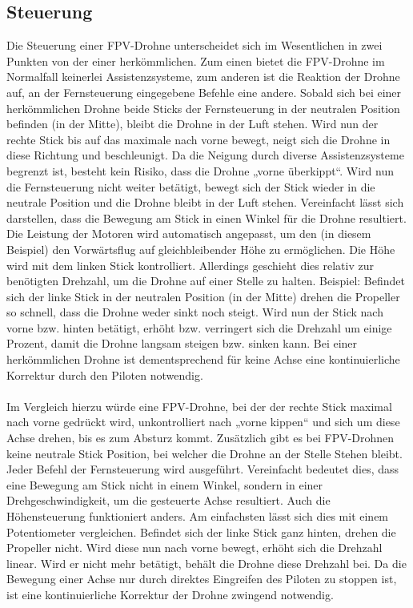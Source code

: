 \subsection[Steuerung]{Steuerung}
Die Steuerung einer FPV-Drohne unterscheidet sich im Wesentlichen in zwei Punkten von der einer herkömmlichen. Zum einen bietet die FPV-Drohne im Normalfall keinerlei Assistenzsysteme, zum anderen ist die Reaktion der Drohne auf, an der Fernsteuerung eingegebene Befehle eine andere. Sobald sich bei einer herkömmlichen Drohne beide Sticks der Fernsteuerung in der neutralen Position befinden (in der Mitte), bleibt die Drohne in der Luft stehen. Wird nun der rechte Stick bis auf das maximale nach vorne bewegt, neigt sich die Drohne in diese Richtung und beschleunigt. Da die Neigung durch diverse Assistenzsysteme begrenzt ist, besteht kein Risiko, dass die Drohne „vorne überkippt“. Wird nun die Fernsteuerung nicht weiter betätigt, bewegt sich der Stick wieder in die neutrale Position und die Drohne bleibt in der Luft stehen. Vereinfacht lässt sich darstellen, dass die Bewegung am Stick in einen Winkel für die Drohne resultiert. Die Leistung der Motoren wird automatisch angepasst, um den (in diesem Beispiel) den Vorwärtsflug auf gleichbleibender Höhe zu ermöglichen. Die Höhe wird mit dem linken Stick kontrolliert. Allerdings geschieht dies relativ zur benötigten Drehzahl, um die Drohne auf einer Stelle zu halten. Beispiel: Befindet sich der linke Stick in der neutralen Position (in der Mitte) drehen die Propeller so schnell, dass die Drohne weder sinkt noch steigt. Wird nun der Stick nach vorne bzw. hinten betätigt, erhöht bzw. verringert sich die Drehzahl um einige Prozent, damit die Drohne langsam steigen bzw. sinken kann. Bei einer herkömmlichen Drohne ist dementsprechend für keine Achse eine kontinuierliche Korrektur durch den Piloten notwendig. 
\\ \\
Im Vergleich hierzu würde eine FPV-Drohne, bei der der rechte Stick maximal nach vorne gedrückt wird, unkontrolliert nach „vorne kippen“ und sich um diese Achse drehen, bis es zum Absturz kommt. Zusätzlich gibt es bei FPV-Drohnen keine neutrale Stick Position, bei welcher die Drohne an der Stelle Stehen bleibt. Jeder Befehl der Fernsteuerung wird ausgeführt. Vereinfacht bedeutet dies, dass eine Bewegung am Stick nicht in einem Winkel, sondern in einer Drehgeschwindigkeit, um die gesteuerte Achse resultiert. Auch die Höhensteuerung funktioniert anders. Am einfachsten lässt sich dies mit einem Potentiometer vergleichen. Befindet sich der linke Stick ganz hinten, drehen die Propeller nicht. Wird diese nun nach vorne bewegt, erhöht sich die Drehzahl linear. Wird er nicht mehr betätigt, behält die Drohne diese Drehzahl bei. Da die Bewegung einer Achse nur durch direktes Eingreifen des Piloten zu stoppen ist, ist eine kontinuierliche Korrektur der Drohne zwingend notwendig.

